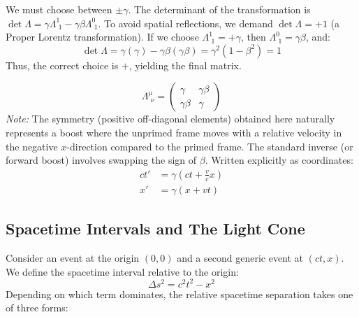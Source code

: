 We must choose between $\pm \gamma$. The determinant of the transformation is $\det \Lambda = \gamma \Lambda^1_{\,\,1} - \gamma \beta \Lambda^0_{\,\,1}$. To avoid spatial reflections, we demand $\det \Lambda = +1$ (a Proper Lorentz transformation). 
If we choose $\Lambda^1_{\,\,1} = +\gamma$, then $\Lambda^0_{\,\,1} = \gamma \beta$, and:
\begin{equation}\label{eq:lec04:determinant-check}
    \det \Lambda = \gamma(\gamma) - \gamma \beta (\gamma \beta) = \gamma^2(1 - \beta^2) = 1
\end{equation}
Thus, the correct choice is $+$, yielding the final matrix.

\begin{equation}\label{eq:lec04:lorentz-matrix}\boxed{
    \Lambda^\mu_{\,\,\nu} = 
    \begin{pmatrix}
        \gamma & \gamma \beta \\
        \gamma \beta & \gamma
    \end{pmatrix}
}\end{equation}
\textit{Note:} The symmetry (positive off-diagonal elements) obtained here naturally represents a boost where the unprimed frame moves with a relative velocity in the negative $x$-direction compared to the primed frame. The standard inverse (or forward boost) involves swapping the sign of $\beta$. Written explicitly as coordinates:
\begin{equation}\label{eq:lec04:coordinate-boost}\boxed{
    \begin{aligned}
        ct' &= \gamma \left(ct + \frac{v}{c} x\right) \\
        x' &= \gamma (x + v t)
    \end{aligned}
}\end{equation}

\subsection*{Spacetime Intervals and The Light Cone}
Consider an event at the origin $(0,0)$ and a second generic event at $(ct, x)$. We define the spacetime interval relative to the origin:
\begin{equation}\label{eq:lec04:interval-1plus1}
    \Delta s^2 = c^2 t^2 - x^2
\end{equation}
Depending on which term dominates, the relative spacetime separation takes one of three forms:

